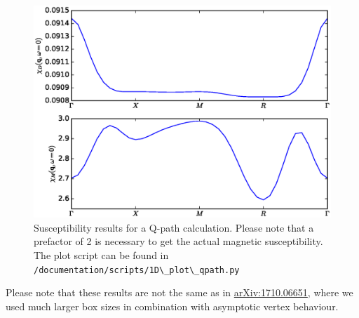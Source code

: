\documentclass[a4paper,11pt]{article}
\numberwithin{equation}{section} %
\begin{document}
\begin{figure}[H]
\begin{center}
\includegraphics[scale=0.75]{qpath.eps}
\caption{Susceptibility results for a Q-path calculation. Please note that a prefactor of 2 is necessary to get the actual magnetic susceptibility. The plot script can be found in {\color{blue}\protect\Verb+/documentation/scripts/1D\_plot\_qpath.py+}}
\end{center}
\end{figure}

Please note that these results are not the same as in \href{https://arxiv.org/abs/1710.06651}{arXiv:1710.06651}, where we used much larger box sizes in combination with asymptotic vertex behaviour.
\end{document}
